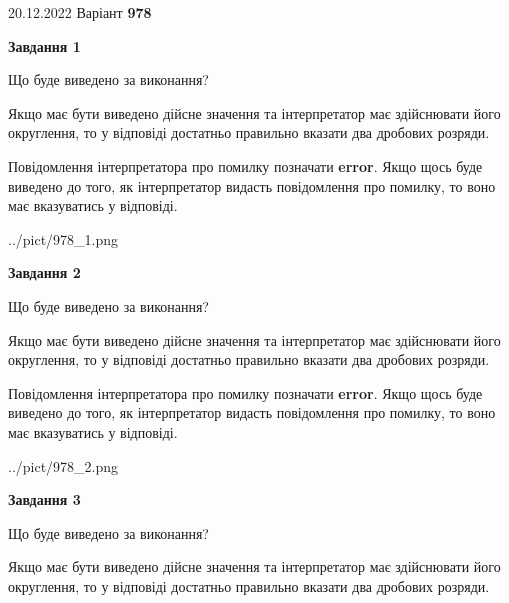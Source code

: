 \documentclass[12pt, ukrainian]{article}
\begin{document}
{20.12.2022 Варіант \No \textbf { 978 }\par}
{
\begin {Large}

{\begin {center}\textbf{Завдання 1}\end {center}}\par
Що буде виведено за виконання? \par

Якщо має бути виведено дійсне значення та інтерпретатор має здійснювати його округлення, 
то у відповіді достатньо правильно вказати два дробових розряди.

Повідомлення інтерпретатора про помилку позначати \textbf{error}.
Якщо щось буде виведено до того, як інтерпретатор видасть повідомлення про помилку, 
то воно має вказуватись у відповіді. \par

\begin{center}
	{../pict/978_1.png}
\end{center}
\newpage

{\begin {center}\textbf{Завдання 2}\end {center}}\par
Що буде виведено за виконання? \par

Якщо має бути виведено дійсне значення та інтерпретатор має здійснювати його округлення, 
то у відповіді достатньо правильно вказати два дробових розряди.

Повідомлення інтерпретатора про помилку позначати \textbf{error}.
Якщо щось буде виведено до того, як інтерпретатор видасть повідомлення про помилку, 
то воно має вказуватись у відповіді. \par

\begin{center}
	{../pict/978_2.png}
\end{center}
\newpage

{\begin {center}\textbf{Завдання 3}\end {center}}\par
Що буде виведено за виконання? \par

Якщо має бути виведено дійсне значення та інтерпретатор має здійснювати його округлення, 
то у відповіді достатньо правильно вказати два дробових розряди.


\end{Large}}
\end{document}
